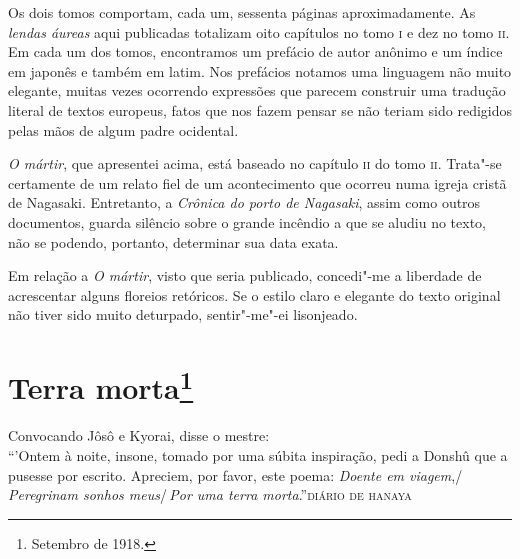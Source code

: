 Os dois tomos comportam, cada um, sessenta páginas aproximadamente. As
\textit{lendas
áureas} aqui publicadas totalizam oito capítulos no tomo \textsc{i} e
dez no tomo \textsc{ii}. Em cada um dos tomos, encontramos um prefácio de autor
anônimo e um índice em japonês e também em latim. Nos prefácios notamos
uma linguagem não muito elegante, muitas vezes ocorrendo expressões que
parecem construir uma tradução literal de textos europeus, fatos que
nos fazem pensar se não teriam sido redigidos pelas mãos de algum padre
ocidental.

\textit{O mártir}, que apresentei acima, está baseado no capítulo \textsc{ii} do tomo
\textsc{ii}. Trata"-se certamente de um relato fiel de um acontecimento que
ocorreu numa igreja cristã de Nagasaki. Entretanto, a \textit{Crônica do porto
de Nagasaki}, assim como outros documentos, guarda silêncio sobre o
grande incêndio a que se aludiu no texto, não se podendo, portanto,
determinar sua data exata.

Em relação a \textit{O mártir}, visto que seria publicado, concedi"-me a
liberdade de acrescentar alguns floreios retóricos. Se o estilo claro e
elegante do texto original não tiver sido muito deturpado, sentir"-me"-ei
lisonjeado.


\chapter{Terra morta\footnote{Setembro de 1918.}}

\setlength{\epigraphwidth}{.60\textwidth}
\begin{epigraphs} 
\qitem
{Convocando Jôsô e Kyorai, disse o mestre:\\
``'Ontem à noite, insone, tomado por uma súbita inspiração, pedi a Donshû que a pusesse por escrito. Apreciem, por favor, este poema: \textit{Doente em viagem},/\,\textit{Peregrinam sonhos meus}/\,\textit{Por uma terra morta}.''}{\textsc{diário de hanaya}\footnotemark}
\end{epigraphs}


